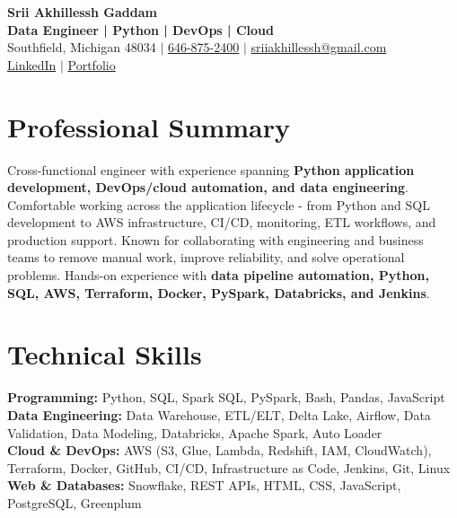 \documentclass[letterpaper,10pt]{article}
\begin{document}
\fontsize{9.35pt}{10.45pt}\selectfont

\begin{center}
    {\LARGE \textbf{Srii Akhillessh Gaddam}} \\[-1pt]
    \textbf{Data Engineer | Python | DevOps | Cloud} \\[2pt]
    Southfield, Michigan 48034 $|$
    \href{tel:6468752400}{646-875-2400} $|$
    \href{mailto:sriiakhillessh@gmail.com}{sriiakhillessh@gmail.com} \\[1pt]
    \href{https://www.linkedin.com/in/srii-akhiilessh-gaddam-b48668191/}{LinkedIn} $|$
    \href{https://sriiakhillesshg.github.io/portfolio/}{Portfolio}
\end{center}
\vspace{-8pt}

\section{Professional Summary}
\small{Cross-functional engineer with experience spanning \textbf{Python application development, DevOps/cloud automation, and data engineering}. Comfortable working across the application lifecycle - from Python and SQL development to AWS infrastructure, CI/CD, monitoring, ETL workflows, and production support. Known for collaborating with engineering and business teams to remove manual work, improve reliability, and solve operational problems. Hands-on experience with \textbf{data pipeline automation, Python, SQL, AWS, Terraform, Docker, PySpark, Databricks, and Jenkins}.}

\section{Technical Skills}
\small{
\textbf{Programming:} Python, SQL, Spark SQL, PySpark, Bash, Pandas, JavaScript \\
\textbf{Data Engineering:} Data Warehouse, ETL/ELT, Delta Lake, Airflow, Data Validation, Data Modeling, Databricks, Apache Spark, Auto Loader \\
\textbf{Cloud \& DevOps:} AWS (S3, Glue, Lambda, Redshift, IAM, CloudWatch), Terraform, Docker, GitHub, CI/CD, Infrastructure as Code, Jenkins, Git, Linux \\
\textbf{Web \& Databases:} Snowflake, REST APIs, HTML, CSS, JavaScript, PostgreSQL, Greenplum
}
\end{document}

